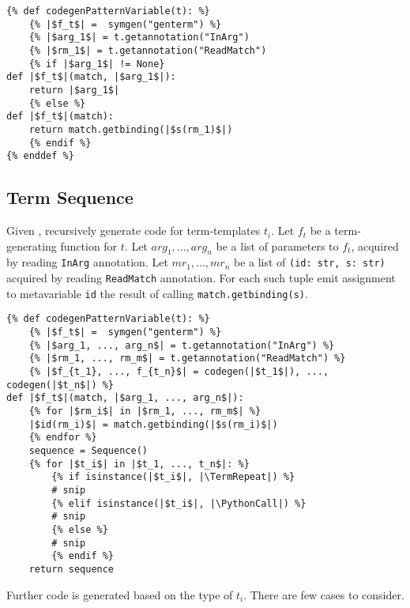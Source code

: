 \begin{verbatim}
{% def codegenPatternVariable(t): %}
	{% |$f_t$| =  symgen("genterm") %}
	{% |$arg_1$| = t.getannotation("InArg")
	{% |$rm_1$| = t.getannotation("ReadMatch")
	{% if |$arg_1$| != None}
def |$f_t$|(match, |$arg_1$|):
	return |$arg_1$|
	{% else %}
def |$f_t$|(match):
	return match.getbinding(|$s(rm_1)$|)
	{% endif %}
{% enddef %}

\end{verbatim}

\subsection{Term Sequence}

Given \TermSequence, recursively generate code for term-templates $t_i$. Let $f_t$ be a term-generating function for $t$. Let $arg_1, ..., arg_n$ be a list of parameters to $f_t$, acquired by reading \texttt{InArg} annotation. Let $mr_1, ..., mr_n$ be a list of \texttt{(id: str, s: str)} acquired by reading \texttt{ReadMatch} annotation. For each such tuple emit assignment to metavariable \texttt{id} the result of calling \texttt{match.getbinding(s)}.

\begin{verbatim}
{% def codegenPatternVariable(t): %}
	{% |$f_t$| =  symgen("genterm") %}
	{% |$arg_1, ..., arg_n$| = t.getannotation("InArg") %}
	{% |$rm_1, ..., rm_m$| = t.getannotation("ReadMatch") %}
	{% |$f_{t_1}, ..., f_{t_n}$| = codegen(|$t_1$|), ..., codegen(|$t_n$|) %}
def |$f_t$|(match, |$arg_1, ..., arg_n$|):
	{% for |$rm_i$| in |$rm_1, ..., rm_m$| %}
	|$id(rm_i)$| = match.getbinding(|$s(rm_i)$|)
	{% endfor %}
	sequence = Sequence()
	{% for |$t_i$| in |$t_1, ..., t_n$|: %}
		{% if isinstance(|$t_i$|, |\TermRepeat|) %}
		# snip 
		{% elif isinstance(|$t_i$|, |\PythonCall|) %}
		# snip
		{% else %}
		# snip
		{% endif %}
	return sequence
\end{verbatim}

Further code is generated based on the type of $t_i$. There are few cases to consider.

